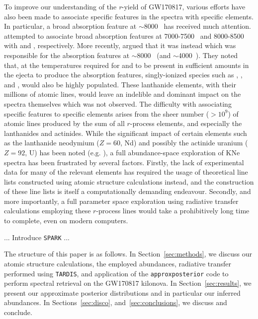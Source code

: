 \documentclass[twocolumn]{aastex63}
\begin{document}
To improve our understanding of the \textit{r}-yield of GW170817, various efforts have also been made to associate specific features in the spectra with specific elements. In particular, a broad absorption feature at $\sim$8000~\text{\AA} has received much attention. \cite{smartt17} attempted to associate broad absorption features at 7000-7500~\text{\AA} and 8000-8500~\text{\AA} with  and , respectively. More recently, \cite{watson19} argued that it was instead  which was responsible for the absorption features at $\sim$8000~\text{\AA} (and $\sim$4000~\text{\AA}). They noted that, at the temperatures required for  and  to be present in sufficient amounts in the ejecta to produce the absorption features, singly-ionized species such as , , and , would also be highly populated. These lanthanide elements, with their millions of atomic lines, would leave an indelible and dominant impact on the spectra themselves which was not observed. The difficulty with associating specific features to specific elements arises from the sheer number ($>10^9$) of atomic lines produced by the sum of all $r$-process elements, and especially the lanthanides and actinides. While the significant impact of certain elements such as the lanthanide neodymium ($Z=60$, Nd) and possibly the actinide uranium ($Z=92$, U) has been noted (e.g. \citealt{kasen13, kasen17, even19}), a full abundance-space exploration of KNe spectra has been frustrated by several factors. Firstly, the lack of experimental data for many of the relevant elements has required the usage of theoretical line lists constructed using atomic structure calculations instead, and the construction of these line lists is itself a computationally demanding endeavour. Secondly, and more importantly, a full parameter space exploration using radiative transfer calculations employing these $r$-process lines would take a prohibitively long time to complete, even on modern computers.  


... Introduce \texttt{SPARK} ...

The structure of this paper is as follows. In Section~\ref{sec:methods}, we discuss our atomic structure calculations, the employed abundances, radiative transfer performed using \texttt{TARDIS}, and application of the \texttt{approxposterior} code to perform spectral retrieval on the GW170817 kilonova. In Section~\ref{sec:results}, we present our approximate posterior distributions and in particular our inferred abundances. In Sections~\ref{sec:disco}, and~\ref{sec:conclusions}, we discuss and conclude.
\end{document}
